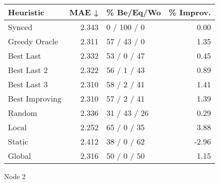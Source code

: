 \begin{tabular}{lrlr}
\toprule
\textbf{Heuristic} & \textbf{MAE ↓} & \textbf{\% Be/Eq/Wo} & \textbf{\% Improv.} \\
\midrule
            Synced &          2.343 &          0 / 100 / 0 &                0.00 \\
     Greedy Oracle &          2.311 &          57 / 43 / 0 &                1.35 \\
         Best Last &          2.332 &          53 / 0 / 47 &                0.45 \\
       Best Last 2 &          2.322 &          56 / 1 / 43 &                0.89 \\
       Best Last 3 &          2.310 &          58 / 2 / 41 &                1.41 \\
    Best Improving &          2.310 &          57 / 2 / 41 &                1.39 \\
            Random &          2.336 &         31 / 43 / 26 &                0.29 \\
             Local &          2.252 &          65 / 0 / 35 &                3.88 \\
            Static &          2.412 &          38 / 0 / 62 &               -2.96 \\
            Global &          2.316 &          50 / 0 / 50 &                1.15 \\
\bottomrule
\end{tabular}
\caption{Node 2}
\label{tab:ds_non_lr01_le2_bs4_2}
